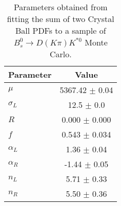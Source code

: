 \begin{table}[h]
  \centering
  \begin{tabular}{lc}
      \toprule
      Parameter & Value \\
      \midrule
      $\mu$ & 5367.42 $\pm$ 0.04 \\
      $\sigma_L$ & 12.5 $\pm$ 0.0 \\
      $R$ & 0.000 $\pm$ 0.000 \\
      $f$ & 0.543 $\pm$ 0.034 \\
      $\alpha_L$ & 1.36 $\pm$ 0.04 \\
      $\alpha_R$ & -1.44 $\pm$ 0.05 \\
      $n_L$ & 5.71 $\pm$ 0.33 \\
      $n_R$ & 5.50 $\pm$ 0.36 \\
  \bottomrule
  \end{tabular}
  \caption{Parameters obtained from fitting the sum of two Crystal Ball PDFs to a sample of $B^0_s \to D(K\pi)K^{*0}$ Monte Carlo.}
\label{tab:signal_Bs_MC_params}
\end{table}
